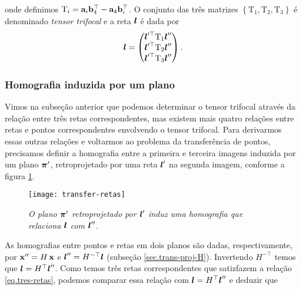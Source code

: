 onde definimos $\mbox{T}_i={\bf a}_i{\bf b}^\top_4-{\bf a}_4{\bf b}_i^\top$. 
O conjunto das três matrizes $\left\{\mbox{T}_1,\mbox{T}_2,\mbox{T}_3\right\}$ é denominado {\it tensor trifocal} e a reta $\boldsymbol{l}$ é dada por
\begin{equation}\label{eq.tres-retas}
\boldsymbol{l}=
\begin{pmatrix}
\boldsymbol{l}'^\top \mbox{T}_1\boldsymbol{l}''\\
\boldsymbol{l}'^\top \mbox{T}_2\boldsymbol{l}''\\
\boldsymbol{l}'^\top \mbox{T}_3\boldsymbol{l}''
\end{pmatrix}.
\end{equation}

\subsubsection{Homografia induzida por um plano}\label{sec.homo-plano-tri}
Vimos na subseção anterior que podemos determinar o tensor trifocal através da relação entre três retas correspondentes, mas existem mais quatro relações entre retas e pontos  correspondentes envolvendo o tensor trifocal. Para derivarmos essas outras relações e voltarmos ao problema da transferência de pontos, precisamos definir a homografia entre a primeira e terceira imagens induzida por um plano $\boldsymbol{\pi}'$, retroprojetado por uma reta $\boldsymbol{l}'$ na segunda imagem, conforme a figura \ref{fig.transfer-retas}.
\begin{figure}[!htb]
\centering
\texttt{[image: transfer-retas]}
\caption{{\it O plano $\boldsymbol{\pi}'$ retroprojetado por $\boldsymbol{l}'$ induz uma homografia que relaciona $\boldsymbol{l}$ com $\boldsymbol{l}''$.}}
\label{fig.transfer-retas}
\end{figure}
As homografias entre pontos e retas em dois planos são dadas, respectivamente, por $\mathbf{x}''=H\,\mathbf{x}$ e $\boldsymbol{l}''=H^{-\top}\boldsymbol{l}$ (subseção \ref{sec.trans-proj-H}). Invertendo $H^{-\top}$ temos que $\boldsymbol{l}=H^\top\boldsymbol{l}''$. Como temos três retas correspondentes que satizfazem a relação \ref{eq.tres-retas}, podemos comparar essa relação com $\boldsymbol{l}=H^\top\boldsymbol{l}''$ e deduzir que 
